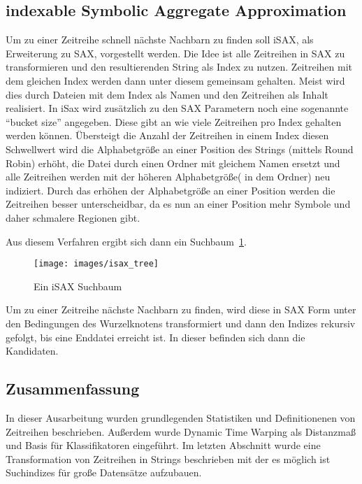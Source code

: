 \subsection{indexable Symbolic Aggregate Approximation} Um zu einer
Zeitreihe schnell nächste Nachbarn zu finden soll iSAX, als
Erweiterung zu SAX, vorgestellt werden.  Die Idee ist alle Zeitreihen
in SAX zu transformieren und den resultierenden String als Index zu
nutzen. Zeitreihen mit dem gleichen Index werden dann unter diesem
gemeinsam gehalten. Meist wird dies durch Dateien mit dem Index als
Namen und den Zeitreihen als Inhalt realisiert.  In iSax
\cite{shieh08, shiehPHD} wird zusätzlich zu den SAX Parametern noch
eine sogenannte ``bucket size'' angegeben. Diese gibt an wie viele
Zeitreihen pro Index gehalten werden können. Übersteigt die Anzahl der
Zeitreihen in einem Index diesen Schwellwert wird die Alphabetgröße an
einer Position des Strings (mittels Round Robin) erhöht, die Datei
durch einen Ordner mit gleichem Namen ersetzt und alle Zeitreihen
werden mit der höheren Alphabetgröße( in dem Ordner) neu indiziert.
Durch das erhöhen der Alphabetgröße an einer Position werden die
Zeitreihen besser unterscheidbar, da es nun an einer Position mehr
Symbole und daher schmalere Regionen gibt.

Aus diesem Verfahren ergibt sich dann ein Suchbaum~\ref{img:sax_tree}.
\begin{figure}[ht] \centering
\texttt{[image: images/isax\_tree]}
\caption{Ein iSAX Suchbaum }
\label{img:sax_tree}
\end{figure}

Um zu einer Zeitreihe nächste Nachbarn zu finden, wird diese in SAX
Form unter den Bedingungen des Wurzelknotens transformiert und dann
den Indizes rekursiv gefolgt, bis eine Enddatei erreicht ist. In
dieser befinden sich dann die Kandidaten.

\subsection{Zusammenfassung} In dieser Ausarbeitung wurden
grundlegenden Statistiken und Definitionenen von Zeitreihen
beschrieben.  Außerdem wurde Dynamic Time Warping als Distanzmaß und
Basis für Klassifikatoren eingeführt. Im letzten Abschnitt wurde eine
Transformation von Zeitreihen in Strings beschrieben mit der es
möglich ist Suchindizes für große Datensätze aufzubauen.

